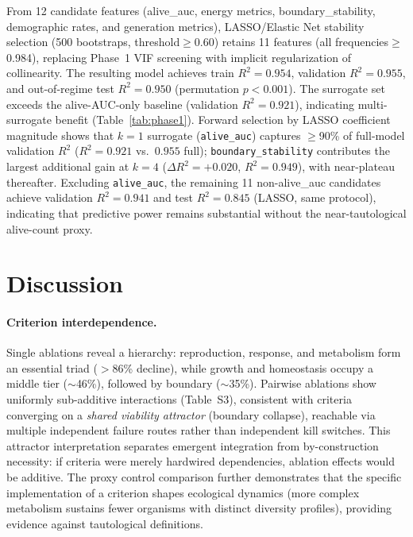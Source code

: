 \documentclass[letterpaper]{article}
\begin{document}
From 12 candidate features (alive\_auc, energy metrics, boundary\_stability,
demographic rates, and generation metrics), LASSO/Elastic Net stability
selection (500 bootstraps, threshold$\geq$0.60) retains 11 features
(all frequencies$\geq$0.984), replacing Phase~1 VIF screening with
implicit regularization of collinearity.
The resulting model achieves train $R^2=0.954$, validation $R^2=0.955$,
and out-of-regime test $R^2=0.950$ (permutation $p <0.001$).
The surrogate set exceeds the alive-AUC-only baseline
(validation $R^2=0.921$), indicating multi-surrogate benefit
(Table~\ref{tab:phase1}).
Forward selection by LASSO coefficient magnitude shows that $k=1$ surrogate
(\texttt{alive\_auc}) captures $\geq$90\% of full-model validation $R^2$
($R^2=0.921$ vs.\ $0.955$ full); \texttt{boundary\_stability} contributes the
largest additional gain at $k=4$ ($\Delta R^2=+0.020$, $R^2=0.949$), with
near-plateau thereafter.
Excluding \texttt{alive\_auc}, the remaining 11 non-alive\_auc candidates
achieve validation $R^2=0.941$ and test $R^2=0.845$ (LASSO, same protocol),
indicating that predictive power remains substantial without the near-tautological
alive-count proxy.

\section{Discussion}

\paragraph{Criterion interdependence.}
Single ablations reveal a hierarchy: reproduction, response, and metabolism
form an essential triad ($>$86\% decline), while growth and homeostasis
occupy a middle tier ($\sim$46\%), followed by boundary ($\sim$35\%).
Pairwise ablations show uniformly sub-additive interactions
(Table~S3), consistent with criteria converging on a
\emph{shared viability attractor} (boundary collapse), reachable via
multiple independent failure routes rather than independent kill switches.
This attractor interpretation separates emergent integration from
by-construction necessity: if criteria were merely hardwired dependencies,
ablation effects would be additive.
The proxy control comparison further demonstrates that the specific
implementation of a criterion shapes ecological dynamics (more complex
metabolism sustains fewer organisms with distinct diversity profiles),
providing evidence against tautological definitions.
\end{document}
